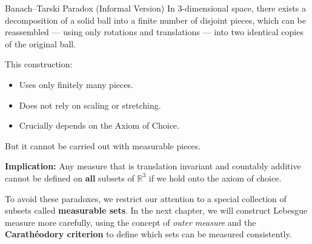 \begin{eg}{Banach–Tarski Paradox (Informal Version)}
In 3-dimensional space, there exists a decomposition of a solid ball into a finite number of disjoint pieces, which can be reassembled — using only rotations and translations — into two identical copies of the original ball.

This construction:
\begin{itemize}
    \item Uses only finitely many pieces.
    \item Does not rely on scaling or stretching.
    \item Crucially depends on the Axiom of Choice.
\end{itemize}

But it cannot be carried out with measurable pieces.

\textbf{Implication:} Any measure that is translation invariant and countably additive cannot be defined on \textbf{all} subsets of \( \mathbb{R}^3 \) if we hold onto the axiom of choice.
\end{eg}

%


\begin{rmk}
To avoid these paradoxes, we restrict our attention to a special collection of subsets called \textbf{measurable sets}. In the next chapter, we will construct Lebesgue measure more carefully, using the concept of \textit{outer measure} and the \textbf{Carathéodory criterion} to define which sets can be measured consistently.
\end{rmk}



